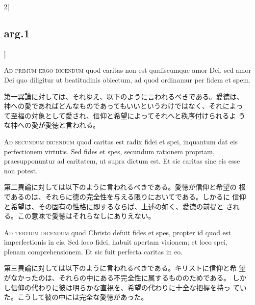 \documentclass[paper=a4paper,fontsize=10pt,jafontsize=9pt,titlepage]{jlreq}
\begin{document}
\begin{paracol}{2}[\subsection{arg.1}]
\switchcolumn*[\subsection{ad.1}]

{\scshape Ad primum ergo dicendum} quod caritas non est qualiscumque
amor Dei, sed amor Dei quo diligitur ut beatitudinis obiectum, ad quod
ordinamur per fidem et spem.

\switchcolumn

第一異論に対しては、それゆえ、以下のように言われるべきである。愛徳は、
 神への愛であればどんなものであってもいいというわけではなく、それによっ
 て至福の対象として愛され、信仰と希望によってそれへと秩序付けられるよ
 うな神への愛が愛徳と言われる。

\switchcolumn*[\subsection{ad.2}]

{\scshape Ad secundum dicendum} quod caritas est radix fidei et spei,
inquantum dat eis perfectionem virtutis. Sed fides et spes, secundum
rationem propriam, praesupponuntur ad caritatem, ut supra dictum
est. Et sic caritas sine eis esse non potest.

\switchcolumn

第二異論に対しては以下のように言われるべきである。愛徳が信仰と希望の
 根であるのは、それらに徳の完全性を与える限りにおいてである。しかるに
 信仰と希望は、その固有の性格に即するならば、上述の如く、愛徳の前提と
 される。この意味で愛徳はそれらなしにありえない。

\switchcolumn*[\subsection{ad.3}]

{\scshape Ad tertium dicendum} quod Christo defuit fides et spes,
propter id quod est imperfectionis in eis. Sed loco fidei, habuit
apertam visionem; et loco spei, plenam comprehensionem. Et sic fuit
perfecta caritas in eo.

\switchcolumn

第三異論に対しては以下のように言われるべきである。キリストに信仰と希
 望がなかったのは、それらの中にある不完全性に属するもののためである。
 しかし信仰の代わりに彼は明らかな直視を、希望の代わりに十全な把握を持っ
 ていた。こうして彼の中には完全な愛徳があった。

\end{paracol}
\end{document}
